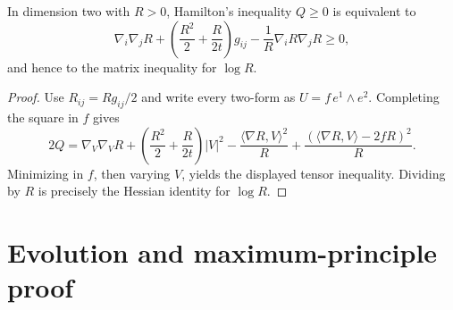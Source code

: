 \begin{proposition}
\label{prop:chow-ii-equivalent-surface-matrix-harnack-forms}


In dimension two with \(R>0\), Hamilton's inequality \(Q\ge0\) is equivalent
to
\[
\nabla_i\nabla_jR+\left(\frac{R^2}{2}+\frac{R}{2t}\right)g_{ij}
-\frac1R\nabla_iR\nabla_jR\ge0,
\]
and hence to the matrix inequality for \(\log R\).
\end{proposition}
\begin{proof}
\sketch Use \(R_{ij}=Rg_{ij}/2\) and write every two-form as
\(U=f\,e^1\wedge e^2\).  Completing the square in \(f\) gives
\[
2Q=\nabla_V\nabla_VR+\left(\frac{R^2}{2}+\frac{R}{2t}\right)|V|^2
-\frac{\langle\nabla R,V\rangle^2}{R}
+\frac{(\langle\nabla R,V\rangle-2fR)^2}{R}.
\]
Minimizing in \(f\), then varying \(V\), yields the displayed tensor
inequality.  Dividing by \(R\) is precisely the Hessian identity for
\(\log R\).
\end{proof}

\section{Evolution and maximum-principle proof}

